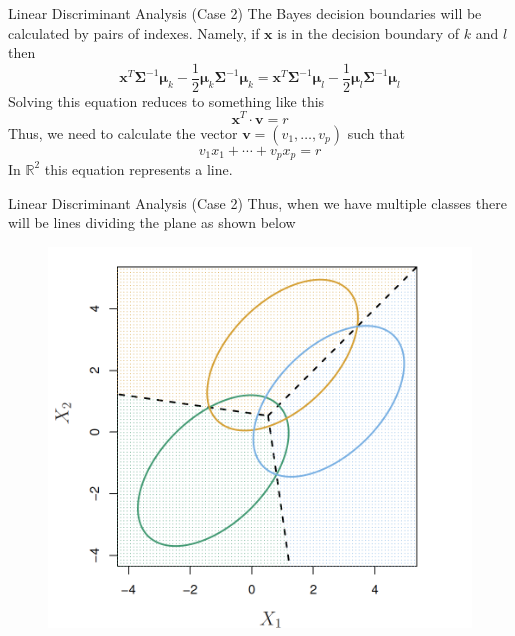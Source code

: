 \documentclass{beamer}
\begin{document}
\begin{frame}{Linear Discriminant Analysis (Case 2)}
	The Bayes decision boundaries will be calculated by pairs of indexes. Namely, if $\bm{x}$ is in the decision boundary of $k$ and $l$ then
	\begin{equation*}
		\bm{x}^T \bm{\Sigma}^{-1} \bm{\mu}_k - \frac{1}{2} \bm{\mu}_k \bm{\Sigma}^{-1} \bm{\mu}_k= 	\bm{x}^T \bm{\Sigma}^{-1} \bm{\mu}_l - \frac{1}{2} \bm{\mu}_l \bm{\Sigma}^{-1} \bm{\mu}_l
	\end{equation*}
Solving this equation reduces to something like this
\begin{equation*}
	\bm{x}^T \cdot \bm{v}= r
\end{equation*}
Thus, we need to calculate the vector $\bm{v}=(v_1,\ldots,v_p)$ such that 
\begin{equation*}
	v_1 x_1 + \cdots + v_p x_p = r
\end{equation*} 
In $\mathbb{R}^2$ this equation represents a line. 
\end{frame}
\begin{frame}{Linear Discriminant Analysis (Case 2)}
	Thus, when we have multiple classes there will be lines dividing the plane as shown below
	\begin{figure}[h]
		\centering
		\includegraphics[scale=0.35]{../../Figures/fig_lda_2d.png}
	\end{figure}
	
\end{frame}
\end{document}

